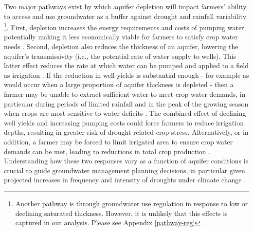 \documentclass[
]{article}
\begin{document}
Two major pathways exist by which aquifer depletion will impact farmers' ability to access and use groundwater as a buffer against drought and rainfall variability \citep{foster2015analysis}\footnote{Another pathway is through groundwater use regulation in response to low or declining saturated thickness. However, it is unlikely that this effects is captured in our analysis. Please see Appendix \ref{pathway-reg}}. First, depletion increases the energy requirements and costs of pumping water, potentially making it less economically viable for farmers to satisfy crop water needs \citep{mieno2017price, bhattarai2021impact}. Second, depletion also reduces the thickness of an aquifer, lowering the aquifer's transmissivity (i.e., the potential rate of water supply to wells). This latter effect reduces the rate at which water can be pumped and applied to a field as irrigation \citep{konikow2005groundwater, foster2014modeling, hrozencik2017heterogeneous}. If the reduction in well yields is substantial enough - for example as would occur when a large proportion of aquifer thickness is depleted \citep{hecox2002calculation, korus2020depletion} - then a farmer may be unable to extract sufficient water to meet crop water demands, in particular during periods of limited rainfall and in the peak of the growing season when crops are most sensitive to water deficits \citep{foster2015well,rouhi2020downside}. The combined effect of declining well yields and increasing pumping costs could force farmers to reduce irrigation depths, resulting in greater risk of drought-related crop stress. Alternatively, or in addition, a farmer may be forced to limit irrigated area to ensure crop water demands can be met, leading to reductions in total crop production \citep{foster2014modeling, rad2020effects}. Understanding how these two responses vary as a function of aquifer conditions is crucial to guide groundwater management planning decisions, in particular given projected increases in frequency and intensity of droughts under climate change \citep{ukkola2020robust, chiang2021evidence, cook2020twenty}.  
\end{document}
